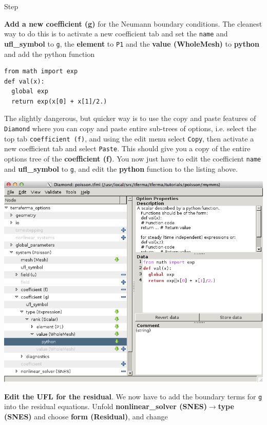 \begin{steps}{Step}
\begin{center}
  \end{center}
\item \textbf{Add a new coefficient (g)} for the Neumann boundary conditions.  The cleanest way to do this is to activate a new coefficient tab and set the \texttt{name} and \textbf{ufl\_symbol} to \texttt{g},  the \textbf{element} to \texttt{P1} and the \textbf{value (WholeMesh)} to \textbf{python} and add the python function
\begin{lstlisting}[style=python]
from math import exp
def val(x):
  global exp
  return exp(x[0] + x[1]/2.)    
\end{lstlisting}

The slightly dangerous, but quicker way is to use the copy and paste features of \texttt{Diamond} where you can copy and paste entire sub-trees of options, i.e. select the top tab \texttt{coefficient (f)}, and using the edit menu select \texttt{Copy}, then activate a new coefficient tab and select \texttt{Paste}.  This should give you a copy of the entire options tree of the \textbf{coefficient (f)}.  You now just have to edit the coefficient \texttt{name} and \textbf{ufl\_symbol} to \texttt{g}, and edit the \textbf{python} function to the listing above. 
 \begin{center}
\includegraphics[width=\diamondwidth]{figures/screendumps/diamond_poisson_mms_g_value.png}
  \end{center} 
\item \textbf{Edit the UFL for the residual}. We now have to add the boundary terms for \texttt{g} into the residual equations.  Unfold \textbf{nonlinear\_solver (SNES)}$\rightarrow$\textbf{type (SNES)} and choose \textbf{form (Residual)}, and change

\end{steps}
